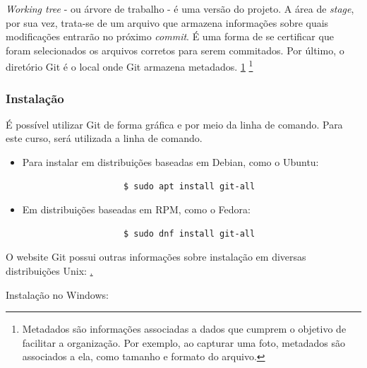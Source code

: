         \textit{Working tree} - ou árvore de trabalho - é uma versão do projeto. A área de \textit{stage}, por sua vez, trata-se de um arquivo que armazena informações sobre quais modificações entrarão no próximo \textit{commit}.
        É uma forma de se certificar que foram selecionados os arquivos corretos para serem commitados. Por último, o diretório Git é o local onde Git armazena metadados. \ref{metadata}
        \footnote{\label{metadata}Metadados são informações associadas a dados que cumprem o objetivo de facilitar a organização. Por exemplo, ao capturar uma foto, metadados são associados a ela, como tamanho e formato do arquivo.}

    \subsubsection{Instalação}
        É possível utilizar Git de forma gráfica e por meio da linha de comando. Para este curso, será utilizada a linha de comando.
        \begin{itemize}
            \item Para instalar em distribuições baseadas em Debian, como o Ubuntu:
                \begin{lstlisting}
                    $ sudo apt install git-all
                \end{lstlisting}
            \item Em distribuições baseadas em RPM, como o Fedora:
                \begin{lstlisting}
                    $ sudo dnf install git-all
                \end{lstlisting}
        \end{itemize}
        O website Git possui outras informações sobre instalação em diversas distribuições Unix: \href{https://git-scm.com/download/linux}.

        \par Instalação no Windows:
